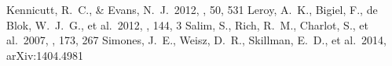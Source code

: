 \documentclass[preprint,11pt]{aastex}
\begin{document}
\begin{thebibliography}

 Kennicutt, R.~C., \& Evans, N.~J.\ 2012, \araa, 50, 531
 Leroy, A.~K., Bigiel, F., de Blok, W.~J.~G., et al.\ 2012, \aj, 144, 3
 Salim, S., Rich, R.~M., Charlot, S., et al.\ 2007, \apjs, 173, 267
 Simones, J.~E., Weisz, D.~R., Skillman, E.~D., et al.\ 2014, arXiv:1404.4981

\end{thebibliography}
\end{document}
